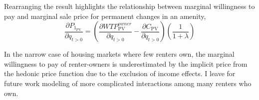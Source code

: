 \documentclass[ecta,nameyear,draft]{econsocart}
\theoremstyle{plain}
\theoremstyle{remark}
\begin{document}
Rearranging the result highlights the relationship between marginal willingness to pay and marginal sale price for permanent changes in an amenity,
\begin{equation}
	\frac{\partial P_{1_{\mathrm{PV}}}} {\partial q_{t>0}}=\left(
	\frac{\partial \mathit{WTP}^{\mathit{owner}}_{\mathrm{PV}}}{\partial q_{t>0}}-\frac{\partial C_{\mathrm{PV}}}{\partial q_{t>0}}\right)\left(\frac{1}{1+\lambda}\right) \label{marginalPriceOwner}
\end{equation}

In the narrow case of housing markets where few renters own, the marginal willingness to pay of renter-owners is underestimated by the implicit price from the hedonic price function due to the exclusion of income effects. I leave for future work modeling of more complicated interactions among many renters who own.
\end{document}
